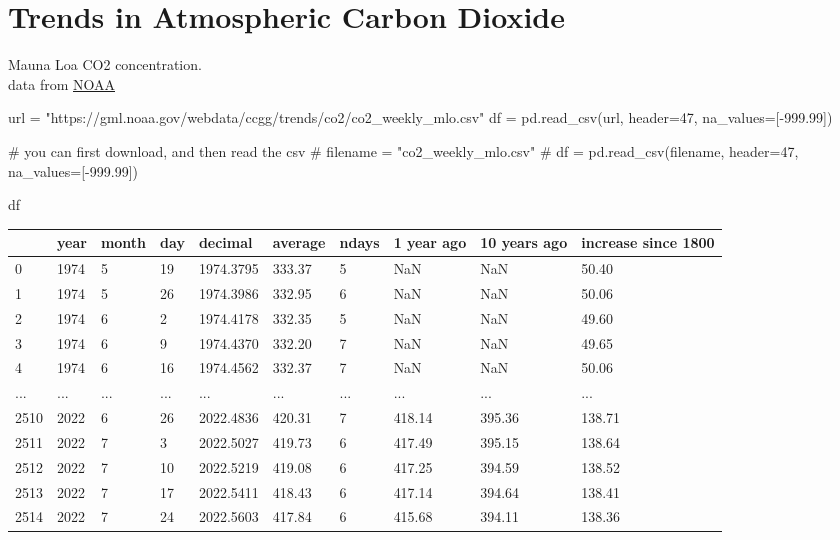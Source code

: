 \documentclass[
  letterpaper,
  DIV=11,
  numbers=noendperiod,
  oneside]{scrreprt}
\newenvironment{Shaded}{\begin{snugshade}}{\end{snugshade}}
\newcommand{\CommentTok}[1]{\textcolor[rgb]{0.37,0.37,0.37}{#1}}
\newcommand{\DecValTok}[1]{\textcolor[rgb]{0.68,0.00,0.00}{#1}}
\newcommand{\FloatTok}[1]{\textcolor[rgb]{0.68,0.00,0.00}{#1}}
\newcommand{\NormalTok}[1]{\textcolor[rgb]{0.00,0.23,0.31}{#1}}
\newcommand{\OperatorTok}[1]{\textcolor[rgb]{0.37,0.37,0.37}{#1}}
\newcommand{\StringTok}[1]{\textcolor[rgb]{0.13,0.47,0.30}{#1}}
\begin{document}
\hypertarget{trends-in-atmospheric-carbon-dioxide}{%
\chapter{Trends in Atmospheric Carbon
Dioxide}\label{trends-in-atmospheric-carbon-dioxide}}

Mauna Loa CO2 concentration.\\
data from \href{https://gml.noaa.gov/ccgg/trends/data.html}{NOAA}

\begin{Shaded}
\begin{Highlighting}[]
\NormalTok{url }\OperatorTok{=} \StringTok{"https://gml.noaa.gov/webdata/ccgg/trends/co2/co2\_weekly\_mlo.csv"}
\NormalTok{df }\OperatorTok{=}\NormalTok{ pd.read\_csv(url, header}\OperatorTok{=}\DecValTok{47}\NormalTok{, na\_values}\OperatorTok{=}\NormalTok{[}\OperatorTok{{-}}\FloatTok{999.99}\NormalTok{])}

\CommentTok{\# you can first download, and then read the csv}
\CommentTok{\# filename = "co2\_weekly\_mlo.csv"}
\CommentTok{\# df = pd.read\_csv(filename, header=47, na\_values=[{-}999.99])}

\NormalTok{df}
\end{Highlighting}
\end{Shaded}

\begin{longtable}[]{@{}llllllllll@{}}
\toprule()
& year & month & day & decimal & average & ndays & 1 year ago & 10 years
ago & increase since 1800 \\
\midrule()
\endhead
0 & 1974 & 5 & 19 & 1974.3795 & 333.37 & 5 & NaN & NaN & 50.40 \\
1 & 1974 & 5 & 26 & 1974.3986 & 332.95 & 6 & NaN & NaN & 50.06 \\
2 & 1974 & 6 & 2 & 1974.4178 & 332.35 & 5 & NaN & NaN & 49.60 \\
3 & 1974 & 6 & 9 & 1974.4370 & 332.20 & 7 & NaN & NaN & 49.65 \\
4 & 1974 & 6 & 16 & 1974.4562 & 332.37 & 7 & NaN & NaN & 50.06 \\
... & ... & ... & ... & ... & ... & ... & ... & ... & ... \\
2510 & 2022 & 6 & 26 & 2022.4836 & 420.31 & 7 & 418.14 & 395.36 &
138.71 \\
2511 & 2022 & 7 & 3 & 2022.5027 & 419.73 & 6 & 417.49 & 395.15 &
138.64 \\
2512 & 2022 & 7 & 10 & 2022.5219 & 419.08 & 6 & 417.25 & 394.59 &
138.52 \\
2513 & 2022 & 7 & 17 & 2022.5411 & 418.43 & 6 & 417.14 & 394.64 &
138.41 \\
2514 & 2022 & 7 & 24 & 2022.5603 & 417.84 & 6 & 415.68 & 394.11 &
138.36 \\
\bottomrule()
\end{longtable}
\end{document}
